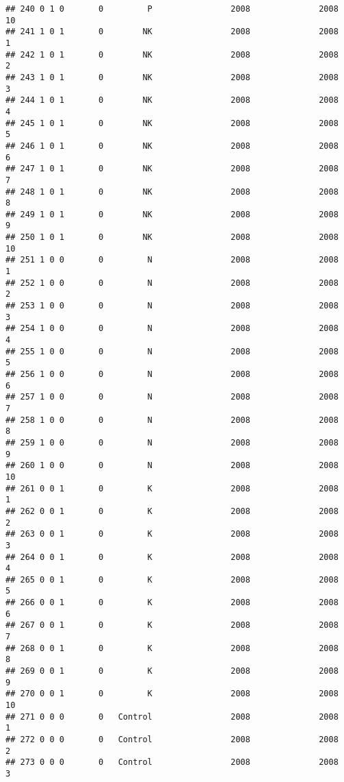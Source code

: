 \documentclass[]{article}
\begin{document}
\begin{verbatim}
## 240 0 1 0       0         P                2008              2008       10
## 241 1 0 1       0        NK                2008              2008        1
## 242 1 0 1       0        NK                2008              2008        2
## 243 1 0 1       0        NK                2008              2008        3
## 244 1 0 1       0        NK                2008              2008        4
## 245 1 0 1       0        NK                2008              2008        5
## 246 1 0 1       0        NK                2008              2008        6
## 247 1 0 1       0        NK                2008              2008        7
## 248 1 0 1       0        NK                2008              2008        8
## 249 1 0 1       0        NK                2008              2008        9
## 250 1 0 1       0        NK                2008              2008       10
## 251 1 0 0       0         N                2008              2008        1
## 252 1 0 0       0         N                2008              2008        2
## 253 1 0 0       0         N                2008              2008        3
## 254 1 0 0       0         N                2008              2008        4
## 255 1 0 0       0         N                2008              2008        5
## 256 1 0 0       0         N                2008              2008        6
## 257 1 0 0       0         N                2008              2008        7
## 258 1 0 0       0         N                2008              2008        8
## 259 1 0 0       0         N                2008              2008        9
## 260 1 0 0       0         N                2008              2008       10
## 261 0 0 1       0         K                2008              2008        1
## 262 0 0 1       0         K                2008              2008        2
## 263 0 0 1       0         K                2008              2008        3
## 264 0 0 1       0         K                2008              2008        4
## 265 0 0 1       0         K                2008              2008        5
## 266 0 0 1       0         K                2008              2008        6
## 267 0 0 1       0         K                2008              2008        7
## 268 0 0 1       0         K                2008              2008        8
## 269 0 0 1       0         K                2008              2008        9
## 270 0 0 1       0         K                2008              2008       10
## 271 0 0 0       0   Control                2008              2008        1
## 272 0 0 0       0   Control                2008              2008        2
## 273 0 0 0       0   Control                2008              2008        3

\end{verbatim}
\end{document}
